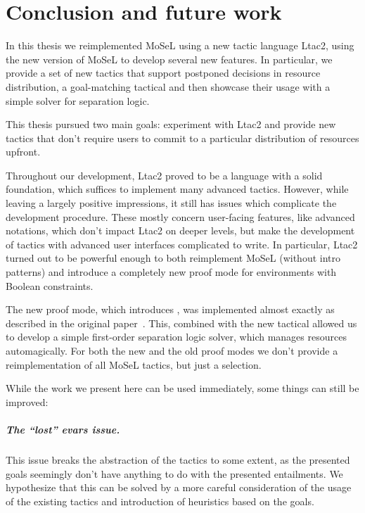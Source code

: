 \chapter{Conclusion and future work}

\vspace{-2em}
In this thesis we reimplemented MoSeL using a new tactic language Ltac2, using the new version of MoSeL to develop several new features.
In particular, we provide a set of new tactics that support postponed decisions in resource distribution, a goal-matching tactical and then showcase their usage with a simple solver for separation logic.

This thesis pursued two main goals: experiment with Ltac2 and provide new tactics that don't require users to commit to a particular distribution of resources upfront.

Throughout our development, Ltac2 proved to be a language with a solid foundation, which suffices to implement many advanced tactics.
However, while leaving a largely positive impressions, it still has issues which complicate the development procedure.
These mostly concern user-facing features, like advanced notations, which don't impact Ltac2 on deeper levels, but make the development of tactics with advanced user interfaces complicated to write.
In particular, Ltac2 turned out to be powerful enough to both reimplement MoSeL (without intro patterns) and introduce a completely new proof mode for environments with Boolean constraints.

The new proof mode, which introduces , was implemented almost exactly as described in the original paper~\cite{harlandResourceDistributionBooleanConstraints2003}.
This, combined with the new tactical  allowed us to develop a simple first-order separation logic solver, which manages resources automagically.
For both the new and the old proof modes we don't provide a reimplementation of all MoSeL tactics, but just a selection.

While the work we present here can be used immediately, some things can still be improved:
\paragraph{The ``lost'' evars issue.}
  This issue breaks the abstraction of the tactics to some extent, as the presented goals seemingly don't have anything to do with the presented entailments.
  We hypothesize that this can be solved by a more careful consideration of the usage of the existing tactics and introduction of heuristics based on the goals.
